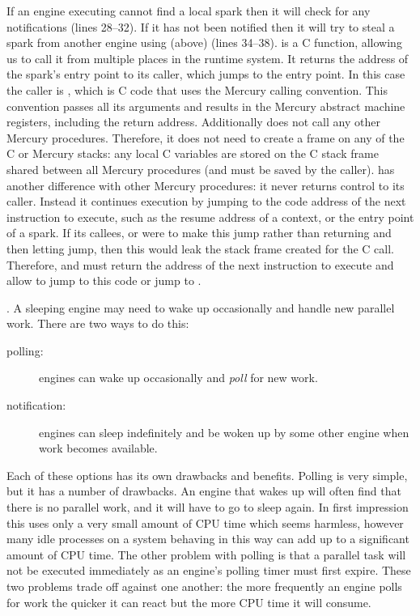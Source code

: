 If an engine executing \idle cannot find a local spark then it will
check for any notifications (lines 28--32).
If it has not been notified then it will try to steal a spark from another
engine using \trystealspark (above) (lines 34--38).
\trystealspark is a C function,
allowing us to call it from multiple places in the runtime system.
It returns the address of the spark's entry point to its caller,
which jumps to the entry point.
In this case the caller is \idle,
which is C code that uses the Mercury calling convention.
This convention passes all its arguments and results in the Mercury abstract
machine registers, including the return address.
Additionally \idle does not call any other Mercury procedures.
Therefore, it does not need to create a frame on any of the C or Mercury stacks:
any local C variables are stored on the C stack frame shared between all
Mercury procedures (and must be saved by the caller).
\idle has another difference with other Mercury procedures:
it never returns control to its caller.
Instead it continues execution by jumping to the code address of the next
instruction to execute,
such as the resume address of a context,
or the entry point of a spark.
If its callees, \trystealspark or \prepareengineforcontext were to make this
jump rather than returning and then letting \idle jump,
then this would leak the stack frame created for the C call.
Therefore, \trystealspark and \prepareengineforcontext must return the
address of the next instruction to execute and allow \idle to jump to this
code or jump to \sleep.

.
A sleeping engine may need to wake up occasionally and handle new parallel
work.
There are two ways to do this:

\begin{description}

    \item[polling:] engines can wake up occasionally and \emph{poll} for new
    work.

    \item[notification:] engines can sleep indefinitely and be woken up by
    some other engine when work becomes available.

\end{description}

\noindent
Each of these options has its own drawbacks and benefits.
Polling is very simple, but it has a number of drawbacks.
An engine that wakes up will often find that there is no parallel work,
and it will have to go to sleep again.
In first impression this uses only a very small amount of CPU time which
seems harmless,
however many idle processes on a system behaving in this way can add up to a
significant amount of CPU time.
The other problem with polling is that a parallel task will not be executed
immediately as an engine's polling timer must first expire.
These two problems trade off against one another:
the more frequently an engine polls for work the quicker it can react but
the more CPU time it will consume.

